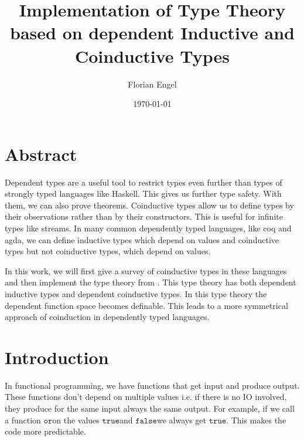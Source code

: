 \documentclass[a4paper,cleardoubleempty,BCOR1cm]{scrbook}
\author{Florian Engel}
\date{\today}
\title{Implementation of Type Theory based on dependent Inductive and Coinductive Types}
\begin{document}
\maketitle


\chapter*{Abstract}
  Dependent types are a useful tool to restrict types even further than types of
  strongly typed languages like Haskell. This gives us further type safety. With
  them, we can also prove theorems. Coinductive types allow us to define types by
  their observations rather than by their constructors. This is useful for
  infinite types like streams. In many common dependently typed languages, like
  coq and agda, we can define inductive types which depend on values and
  coinductive types but not coinductive types, which depend on values.

In this work, we will first give a survey of coinductive types in these
languages and then implement the type theory from \cite{basold2016type}. This
type theory has both dependent inductive types and dependent coinductive
types. In this type theory the dependent function space becomes definable.
This leads to a more symmetrical approach of coinduction in dependently typed
languages.

\setcounter{tocdepth}{2}
\tableofcontents

\chapter{Introduction}
\label{sec:orge12dd80}
In functional programming, we have functions that get input and produce
output. These functions don't depend on multiple values i.e. if there is no IO
involved, they produce for the same input always the same output. For example,
if we call a function $\mathtt{or}$\;on the values $\mathtt{true}$\;and $\mathtt{false}$\;we always get
$\mathtt{true}$. This makes the code more predictable.
\end{document}
